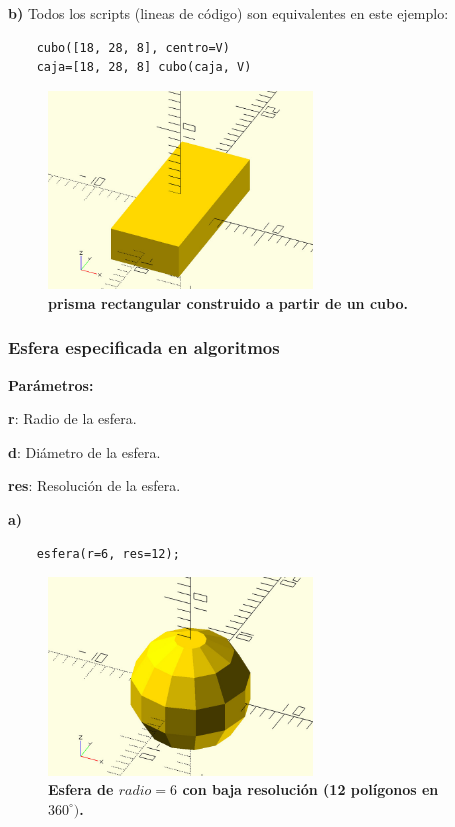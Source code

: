 \clearpage
\textbf{b)} Todos los scripts (lineas de código) son equivalentes en este ejemplo: \begin{listing}[ht]
\begin{verbatim}
    cubo([18, 28, 8], centro=V)
    caja=[18, 28, 8] cubo(caja, V)
\end{verbatim}
\end{listing}

\begin{figure}[h]
\includegraphics[width=7cm]{Img/Modelos/modelado2.jpg}
\centering
\caption{\textbf{\footnotesize{prisma rectangular construido a partir de un cubo. }}}
\end{figure}

\clearpage
\subsubsection{Esfera especificada en algoritmos}

\begin{description}
\item \textbf{Parámetros:}
\item  \textbf{r}: Radio de la esfera.
\item  \textbf{d}: Diámetro de la esfera.
\item  \textbf{res}: Resolución de la esfera.
\end{description}

\textbf{a)} 

\begin{verbatim}
    esfera(r=6, res=12); 
\end{verbatim}


\begin{figure}[h]
\includegraphics[width=7cm]{Img/Modelos/modelado3.jpg}
\centering
\caption{\textbf{\footnotesize{Esfera de $radio=6$ con baja resolución (12 polígonos en $360^\circ)$. }}}
\end{figure}

